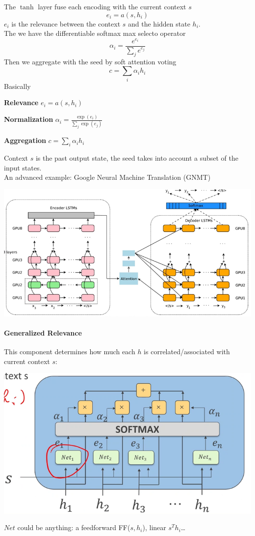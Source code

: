 \documentclass[10pt]{report}
\begin{document}
The $\tanh$ layer fuse each encoding with the current context $s$
$$e_i = a(s, h_i)$$
$e_i$ is the relevance between the context $s$ and the hidden state $h_i$.\\
The we have the differentiable softmax max selecto operator
$$\alpha_i = \frac{e^{e_i}}{\sum_j e^{e_j}}$$
Then we aggregate with the seed by soft attention voting
$$c= \sum_i \alpha_ih_i$$
Basically
\begin{list}{}{}
	\item \textbf{Relevance} $e_i = a(s, h_i)$
	\item \textbf{Normalization} $\alpha_i = \frac{\exp(e_i)}{\sum_j \exp(e_j)}$
	\item \textbf{Aggregation} $c= \sum_i \alpha_ih_i$
\end{list}
Context $s$ is the past output state, the seed takes into account a subset of the input states.\\
An advanced example: Google Neural Machine Translation (GNMT)
\begin{center}
	\includegraphics[scale=0.5]{115.png}
\end{center}
\pagebreak
\paragraph{Generalized Relevance} This component determines how much each $h$ is correlated/associated with current context $s$:
\begin{center}
	\includegraphics[scale=0.5]{116.png}
\end{center}
$Net$ could be anything: a feedforward FF($s, h_i$), linear $s^Th_i$\ldots
\end{document}
